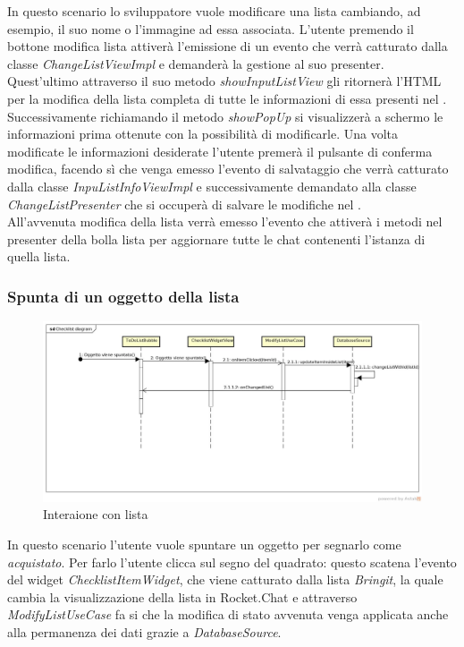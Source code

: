 In questo scenario lo sviluppatore vuole modificare una lista cambiando, ad esempio, il suo nome o l'immagine ad essa associata. L'utente premendo il bottone modifica lista attiverà l'emissione di un evento che verrà catturato dalla classe \textit{ChangeListViewImpl} e demanderà la  gestione al suo presenter. Quest'ultimo attraverso il suo  metodo \textit{showInputListView} gli ritornerà l'HTML per la modifica della lista completa di tutte le informazioni di essa presenti nel . Successivamente richiamando il metodo \textit{showPopUp} si visualizzerà a schermo  le informazioni prima ottenute con la possibilità di modificarle. Una volta modificate le informazioni desiderate l'utente premerà il pulsante di conferma modifica, facendo sì che venga emesso l'evento di salvataggio che verrà catturato dalla classe \textit{InpuListInfoViewImpl} e successivamente demandato alla classe \textit{ChangeListPresenter} che si occuperà di salvare le modifiche nel . \\
All'avvenuta modifica della lista  verrà emesso l'evento che attiverà i metodi nel presenter della bolla lista per aggiornare tutte le chat contenenti l'istanza di quella lista.
 
\subsubsection{Spunta di un oggetto della lista}

\label{Interaione con lista}
\begin{figure}[H]
	\centering
	\includegraphics[width=\textwidth]{Sezioni/Diagrammi/App/Checklist_diagram.jpg}
	\caption{Interaione con lista}
\end{figure}

In questo scenario l'utente vuole spuntare un oggetto per segnarlo come \textit{acquistato}.
Per farlo l'utente clicca sul segno del quadrato: questo scatena l'evento del widget \textit{ChecklistItemWidget}, che viene catturato dalla lista \textit{Bringit}, la quale cambia la visualizzazione della lista in Rocket.Chat e attraverso \textit{ModifyListUseCase} fa si che la modifica di stato avvenuta venga applicata anche alla permanenza dei dati grazie a \textit{DatabaseSource}.


